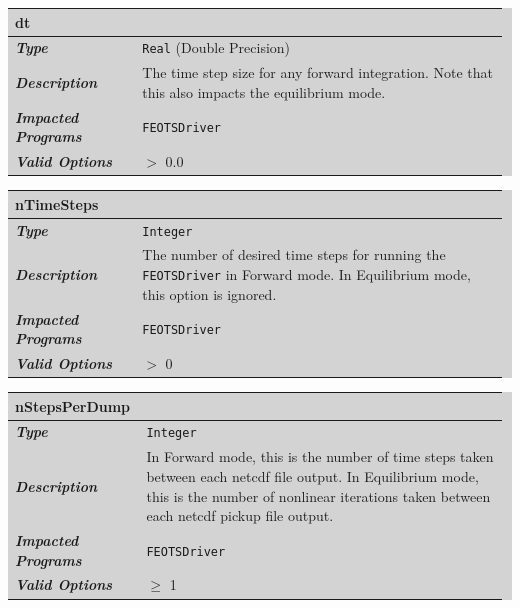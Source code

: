 \documentclass{softwaremanual}
\begin{document}


\noindent\begingroup\setlength{\fboxsep}{0pt}
\colorbox{lightgray}{
\begin{tabular}{p{0.25\linewidth} p{0.725\linewidth}}
\toprule
\textbf{dt} & \\
\midrule
\textbf{\textit{Type}} & \texttt{Real} (Double Precision) \\
\midrule
\textbf{\textit{Description}} & The time step size for any forward integration. Note that this also impacts the equilibrium mode.  \\
\midrule
\textbf{\textit{Impacted Programs}} &  \texttt{FEOTSDriver} \\
\midrule
\textbf{\textit{Valid Options}}  & $>$ 0.0 \\
\bottomrule
\end{tabular}
}\endgroup


\noindent\begingroup\setlength{\fboxsep}{0pt}
\colorbox{lightgray}{
\begin{tabular}{p{0.25\linewidth} p{0.725\linewidth}}
\toprule
\textbf{nTimeSteps} & \\
\midrule
\textbf{\textit{Type}} & \texttt{Integer} \\
\midrule
\textbf{\textit{Description}} & The number of desired time steps for running the \texttt{FEOTSDriver} in Forward mode. In Equilibrium mode, this option is ignored.  \\
\midrule
\textbf{\textit{Impacted Programs}} & \texttt{FEOTSDriver} \\
\midrule
\textbf{\textit{Valid Options}}  & $>$ 0 \\
\bottomrule
\end{tabular}
}\endgroup


\noindent\begingroup\setlength{\fboxsep}{0pt}
\colorbox{lightgray}{
\begin{tabular}{p{0.25\linewidth} p{0.725\linewidth}}
\toprule
\textbf{nStepsPerDump} & \\
\midrule
\textbf{\textit{Type}} & \texttt{Integer} \\
\midrule
\textbf{\textit{Description}} & In Forward mode, this is the number of time steps taken between each netcdf file output. In Equilibrium mode, this is the number of nonlinear iterations taken between each netcdf pickup file output. \\
\midrule
\textbf{\textit{Impacted Programs}} & \texttt{FEOTSDriver} \\
\midrule
\textbf{\textit{Valid Options}}  & $\geq$ 1 \\
\bottomrule
\end{tabular}
}\endgroup
\end{document}
